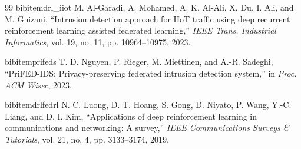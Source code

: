 \documentclass[conference]{IEEEtran}
\begin{document}
\begin{thebibliography}{99}
 bibitem{drl_iiot}
M. Al-Garadi, A. Mohamed, A. K. Al-Ali, X. Du, I. Ali, and M. Guizani, ``Intrusion detection approach for IIoT traffic using deep recurrent reinforcement learning assisted federated learning,'' \textit{IEEE Trans. Industrial Informatics}, vol. 19, no. 11, pp. 10964--10975, 2023.

 bibitem{prifeds}
T. D. Nguyen, P. Rieger, M. Miettinen, and A.-R. Sadeghi, ``PriFED-IDS: Privacy-preserving federated intrusion detection system,'' in \textit{Proc. ACM Wisec}, 2023.

 bibitem{drlfedrl}
N. C. Luong, D. T. Hoang, S. Gong, D. Niyato, P. Wang, Y.-C. Liang, and D. I. Kim, ``Applications of deep reinforcement learning in communications and networking: A survey,'' \textit{IEEE Communications Surveys \& Tutorials}, vol. 21, no. 4, pp. 3133--3174, 2019.

\end{thebibliography}
\end{document}
